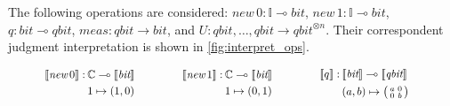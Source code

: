 The following operations are considered: $\textit{new} \hspace{2pt} 0  :\mathbb{I}  \multimap \textit{bit} $, $\textit{new} \hspace{2pt} 1  :\mathbb{I}  \multimap \textit{bit} $, $q : \textit{bit}  \multimap \textit{qbit}$, $\textit{meas}:\textit{qbit} \xrightarrow{} \textit{bit}$, and $\textit{U}:\textit{qbit},\ldots,\textit{qbit} \xrightarrow{} \textit{qbit}^{\otimes n}$. Their correspondent judgment interpretation is shown in \autoref{fig:interpret_ops}. 



\begin{figure}[H]
  \begin{equation*}
  \begin{split}
  \begin{aligned}
  &
  \hspace{0pt}
  \begin{minipage}[t]{0.45\textwidth}
  $\begin{aligned}
    [\![\textit{new} \, 0 ]\!] : \hspace{2pt}& \mathbb{C} \multimap \llbracket \textit{bit} \rrbracket  \\
  & 1 \mapsto (1,0)
  \end{aligned}$
  \end{minipage}
  \hspace{-30pt}
  \begin{minipage}[t]{0.45\textwidth}
  $\begin{aligned}
    [\![\textit{new} \, 1 ]\!] :\hspace{2pt}& \mathbb{C} \multimap \llbracket \textit{bit} \rrbracket  \\
    & 1 \mapsto (0,1)
  \end{aligned}$
  \end{minipage} 
  \hspace{-30pt}
  \begin{minipage}[t]{0.45\textwidth}
  $\begin{aligned}
    [\![q ]\!] : \hspace{2pt}&\llbracket \textit{bit} \rrbracket \multimap \llbracket \textit{qbit} \rrbracket\\
     &(a,b) \mapsto \big(\begin{smallmatrix}
    a & 0\\
    0 & b
  \end{smallmatrix}\big) 
  \end{aligned}$
  \end{minipage} \\

\end{aligned}
\end{split}
\end{equation*}
\end{figure}
